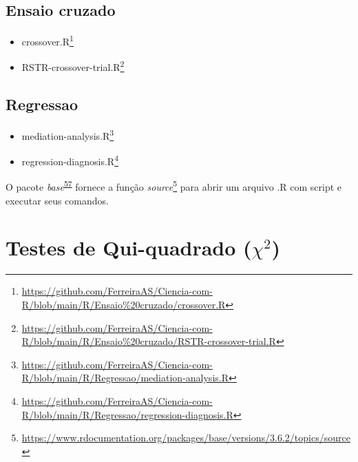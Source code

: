 \documentclass[
  a4paper,
]{book}
\renewcommand{\href}[2]{#2\footnote{\url{#1}}}
\newenvironment{infobox}[1]
  {
  \begin{itemize}
  \renewcommand{\labelitemi}{
    \raisebox{-.7\height}[0pt][0pt]{
      {\setkeys{Gin}{width=3em,keepaspectratio}
        \texttt{[image: \#1]}}
    }
  }
  \setlength{\fboxsep}{1em}
  \begin{blackbox}
  \item
  }
  {
  \end{blackbox}
  \end{itemize}
  }
\begin{document}
\hypertarget{ensaio-cruzado}{%
\subsection{Ensaio cruzado}\label{ensaio-cruzado}}

\begin{itemize}
\item
  \href{https://github.com/FerreiraAS/Ciencia-com-R/blob/main/R/Ensaio\%20cruzado/crossover.R}{crossover.R}
\item
  \href{https://github.com/FerreiraAS/Ciencia-com-R/blob/main/R/Ensaio\%20cruzado/RSTR-crossover-trial.R}{RSTR-crossover-trial.R}
\end{itemize}

\hypertarget{regressao}{%
\subsection{Regressao}\label{regressao}}

\begin{itemize}
\item
  \href{https://github.com/FerreiraAS/Ciencia-com-R/blob/main/R/Regressao/mediation-analysis.R}{mediation-analysis.R}
\item
  \href{https://github.com/FerreiraAS/Ciencia-com-R/blob/main/R/Regressao/regression-diagnosis.R}{regression-diagnosis.R}
\end{itemize}

\begin{infobox}{images/Rlogo}
O pacote \emph{base}\textsuperscript{\protect\hyperlink{ref-base-2}{57}} fornece a função \href{https://www.rdocumentation.org/packages/base/versions/3.6.2/topics/source}{\emph{source}} para abrir um arquivo .R com script e executar seus comandos.

\end{infobox}

\hypertarget{testes-de-qui-quadrado-chi2}{%
\section{\texorpdfstring{Testes de Qui-quadrado (\(\chi^2\))}{Testes de Qui-quadrado (\textbackslash chi\^{}2)}}\label{testes-de-qui-quadrado-chi2}}
\end{document}

